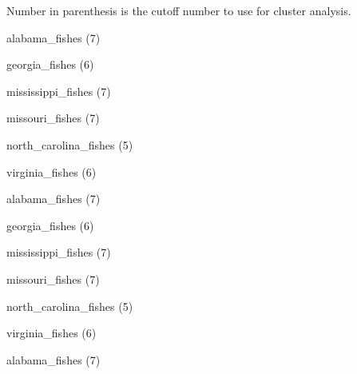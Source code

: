 \documentclass[11pt]{article}
\begin{document}
\thispagestyle{empty}

Number in parenthesis is the cutoff number to use for cluster analysis.

\begin{multicols}{2}
	\Large
alabama\_fishes (7)

\vspace{1\baselineskip}

georgia\_fishes (6)

\vspace{1\baselineskip}

mississippi\_fishes (7)

\vspace{1\baselineskip}

missouri\_fishes (7)

\vspace{1\baselineskip}

north\_carolina\_fishes (5)

\vspace{1\baselineskip}



virginia\_fishes (6)

\vspace{1\baselineskip}

alabama\_fishes (7)

\vspace{1\baselineskip}

georgia\_fishes (6)

\vspace{1\baselineskip}

mississippi\_fishes (7)

\vspace{1\baselineskip}

missouri\_fishes (7)

\vspace{1\baselineskip}

north\_carolina\_fishes (5)

\vspace{1\baselineskip}



virginia\_fishes (6)

\columnbreak

alabama\_fishes (7)


\end{multicols}
\end{document}
